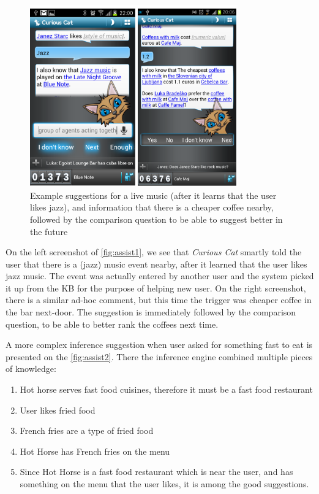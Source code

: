 \begin{figure}[htb]
	\centering
		\includegraphics[width=0.8\textwidth]{figures/assistExample1.png}
	\caption{Example suggestions for a live music (after it learns that the user likes jazz), and information that there is a cheaper coffee nearby, followed by the comparison question to be able to suggest better in the future}
	\label{fig:assist1}
\end{figure}

On the left screenshot of \autoref{fig:assist1}, we see that \emph{Curious Cat}
smartly told the user that there is a (jazz) music event nearby, after it 
learned that the user likes jazz music. The event was actually entered by 
another user and the system picked it up from the KB for the purpose of 
helping new user. On the right screenshot, there is a similar ad-hoc comment, 
but this time the trigger was cheaper coffee in the bar next-door. The 
suggestion is immediately followed by the comparison question, to be able to 
better rank the coffees next time.

A more complex inference suggestion when user asked for something fast to eat 
is presented on the \autoref{fig:assist2}. There the inference engine combined 
multiple pieces of knowledge:
\begin{enumerate}
\item Hot horse serves fast food cuisines, therefore it must be a fast food 
restaurant
\item User likes fried food
\item French fries are a type of fried food
\item Hot Horse has French fries on the menu
\item Since Hot Horse is a fast food restaurant which is near the user, and has 
something on the menu that the user likes, it is among the good suggestions.
\end{enumerate}

